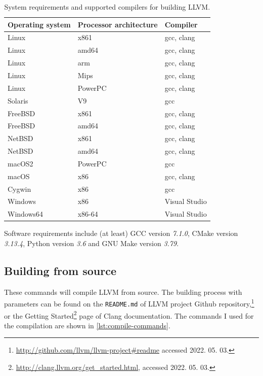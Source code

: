 \begin{table}[H]
	\centering
	\begin{tabular}{ | m{} | m{} | m{} | }
		\hline
		\textbf{Operating system} & \textbf{Processor architecture} & \textbf{Compiler} \\
		\hline \hline
		Linux & x861 & gcc, clang \\
		\hline
		Linux & amd64 & gcc, clang \\
		\hline
		Linux & arm & gcc, clang \\
		\hline
		Linux & Mips & gcc, clang \\
		\hline
		Linux & PowerPC & gcc, clang \\
		\hline
		Solaris & V9 & gcc \\
		\hline
		FreeBSD & x861 & gcc, clang \\
		\hline
		FreeBSD & amd64 & gcc, clang \\
		\hline
		NetBSD & x861 & gcc, clang \\
		\hline
		NetBSD & amd64 & gcc, clang \\
		\hline
		macOS2 & PowerPC & gcc \\
		\hline
		macOS & x86 & gcc, clang \\
		\hline
		Cygwin & x86 & gcc \\
		\hline
		Windows & x86 & Visual Studio \\
		\hline
		Windows64 & x86-64 & Visual Studio \\
		\hline
	\end{tabular}
	\caption{System requirements and supported compilers for building LLVM.}
	\label{tab:clang-req}
\end{table}

Software requirements include (at least) GCC version \emph{7.1.0}, CMake version \emph{3.13.4}, Python version \emph{3.6} and GNU Make version \emph{3.79}.

\subsection{Building from source}

These commands will compile LLVM from source. The building process with parameters can be found on the \texttt{README.md} of
LLVM project Github repository,\footnote{\url{http://github.com/llvm/llvm-project\#readme} accessed 2022. 05. 03.} or the Getting
Started\footnote{\url{http://clang.llvm.org/get_started.html}, accessed 2022. 05. 03.} page of Clang documentation. The commands I used for
the compilation are shown in \cref{lst:compile-commands}.

